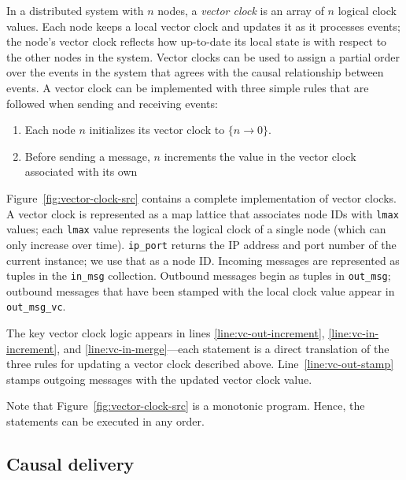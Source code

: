 In a distributed system with $n$ nodes, a \emph{vector clock} is an array of $n$
logical clock values. Each node keeps a local vector clock and updates it as it
processes events; the node's vector clock reflects how up-to-date its local
state is with respect to the other nodes in the system. Vector clocks can be
used to assign a partial order over the events in the system that agrees with
the causal relationship between events. A vector clock can be implemented with
three simple rules that are followed when sending and receiving events:
\begin{enumerate}
\item
  Each node $n$ initializes its vector clock to $\{n \rightarrow 0\}$.
\item
  Before sending a message, $n$ increments the value in the vector clock
  associated with its own 
\end{enumerate}

Figure~\ref{fig:vector-clock-src} contains a complete \lang implementation of
vector clocks. A vector clock is represented as a map lattice that associates
node IDs with \texttt{lmax} values; each \texttt{lmax} value represents the
logical clock of a single node (which can only increase over
time). \texttt{ip\_port} returns the IP address and port number of the current
\lang instance; we use that as a node ID. Incoming messages are represented as
tuples in the \texttt{in\_msg} collection. Outbound messages begin as tuples in
\texttt{out\_msg}; outbound messages that have been stamped with the local clock
value appear in \texttt{out\_msg\_vc}.

The key vector clock logic appears in lines \ref{line:vc-out-increment},
\ref{line:vc-in-increment}, and \ref{line:vc-in-merge}---each \lang statement is
a direct translation of the three rules for updating a vector clock described
above. Line~\ref{line:vc-out-stamp} stamps outgoing messages with the updated
vector clock value.

Note that Figure~\ref{fig:vector-clock-src} is a monotonic \lang program. Hence,
the statements can be executed in any order.

\subsection{Causal delivery}

